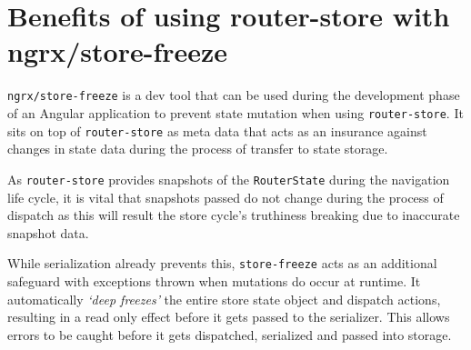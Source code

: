 \section{Benefits of using router-store with ngrx/store-freeze}
\texttt{ngrx/store-freeze} is a dev tool that can be used during the development
phase of an Angular application to prevent state mutation when using
\texttt{router-store}. It sits on top of \texttt{router-store} as meta data that
acts as an insurance against changes in state data during the process of
transfer to state storage.

As \texttt{router-store} provides snapshots of the \texttt{RouterState} during
the navigation life cycle, it is vital that snapshots passed do not change
during the process of dispatch as this will result the store cycle's truthiness
breaking due to inaccurate snapshot data.

While serialization already prevents this, \texttt{store-freeze} acts as an
additional safeguard with exceptions thrown when mutations do occur at runtime.
It automatically \emph{`deep freezes'} the entire store state object and
dispatch actions, resulting in a read only effect before it gets passed to the
serializer. This allows errors to be caught before it gets dispatched,
serialized and passed into storage.
